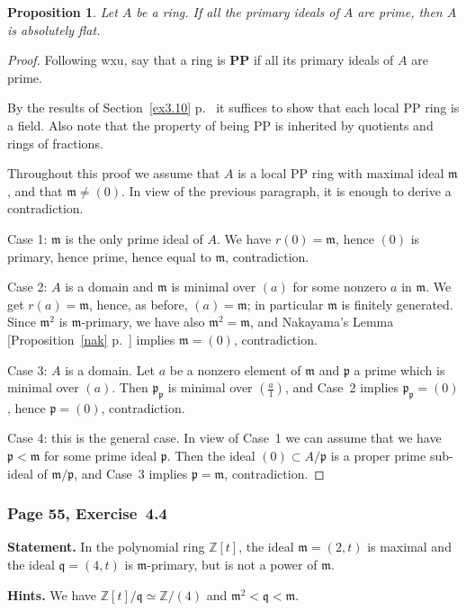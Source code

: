 \documentclass[12pt,letterpaper]{article}%
\newcommand{\mf}{\mathfrak}
\newcommand{\mmm}{\mf m}
\newcommand{\ppp}{\mf p}
\newcommand{\qqq}{\mf q}
\newcommand{\nn}{\noindent}
\newtheorem{prop}[thm]{Proposition}
\begin{document}
\begin{prop}\label{pp}
Let $A$ be a ring. If all the primary ideals of $A$ are prime, then $A$ is absolutely flat.
\end{prop}
\begin{proof}
Following wxu, say that a ring is \textbf{PP} if all its primary ideals of $A$ are prime. 

By the results of Section~\ref{ex3.10} p.~\pageref{ex3.10} it suffices to show that each local PP ring is a field. Also note that the property of being PP is inherited by quotients and rings of fractions.

Throughout this proof we assume that $A$ is a local PP ring with maximal ideal $\mmm$, and that $\mmm\ne(0)$. In view of the previous paragraph, it is enough to derive a contradiction.

\nn Case 1: $\mmm$ is the only prime ideal of $A$. We have $r(0)=\mmm$, hence $(0)$ is primary, hence prime, hence equal to $\mmm$, contradiction.

\nn Case 2: $A$ is a domain and $\mmm$ is minimal over $(a)$ for some nonzero $a$ in $\mmm$. We get $r(a)=\mmm$, hence, as before, $(a)=\mmm$; in particular $\mmm$ is finitely generated. Since $\mmm^2$ is $\mmm$-primary, we have also $\mmm^2=\mmm$, and Nakayama's Lemma [Proposition~\ref{nak} p.~\pageref{nak}] implies $\mmm=(0)$, contradiction.

\nn Case 3: $A$ is a domain. Let $a$ be a nonzero element of $\mmm$ and $\ppp$ a prime which is minimal over $(a)$. Then $\ppp_\ppp$ is minimal over $(\frac a1)$, and Case~2 implies $\ppp_\ppp=(0)$, hence $\ppp=(0)$, contradiction.

\nn Case 4: this is the general case. In view of Case~1 we can assume that we have $\ppp<\mmm$ for some prime ideal $\ppp$. Then the ideal $(0)\subset A/\ppp$ is a proper prime sub-ideal of $\mmm/\ppp$, and Case~3 implies $\ppp=\mmm$, contradiction.
\end{proof}

\subsubsection{Page 55, Exercise~4.4}%

\textbf{Statement.} In the polynomial ring $\mathbb Z[t]$, the ideal $\mmm=(2,t)$ is maximal and the ideal $\qqq=(4,t)$ is $\mmm$-primary, but is not a power of $\mmm$.

\nn\textbf{Hints.} We have $\mathbb Z[t]/\qqq\simeq\mathbb Z/(4)$ and $\mmm^2<\qqq<\mmm$.
\end{document}

